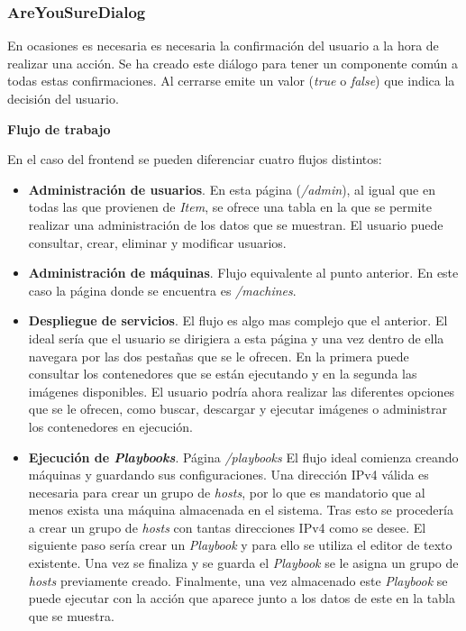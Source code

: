 \subsubsection{AreYouSureDialog}


En ocasiones es necesaria es necesaria la confirmación del usuario a la hora de realizar una acción. Se ha creado este  diálogo para tener un componente común a todas estas confirmaciones. Al cerrarse emite un valor (\textit{true} o \textit{false}) que indica la decisión del usuario.


\bigskip
\textbf{Flujo de trabajo}

En el caso del frontend se pueden diferenciar cuatro flujos distintos:

\begin{itemize}
	\item \textbf{Administración de usuarios}. En esta página (\textit{/admin}), al igual que en todas las que provienen de \textit{Item}, se ofrece una tabla en la que se permite realizar una administración de los datos que se muestran. El usuario puede consultar, crear, eliminar y modificar usuarios.
	\item \textbf{Administración de máquinas}. Flujo equivalente al punto anterior. En este caso la página donde se encuentra es \textit{/machines}.
	\item \textbf{Despliegue de servicios}. El flujo es algo mas complejo que el anterior. El ideal sería que el usuario se dirigiera a esta página y una vez dentro de ella navegara por las dos pestañas que se le ofrecen. En la primera puede consultar los contenedores que se están ejecutando y en la segunda las imágenes disponibles. El usuario podría ahora realizar las diferentes opciones que se le ofrecen, como buscar, descargar y ejecutar imágenes o administrar los contenedores en ejecución.
	\item \textbf{Ejecución de \textit{Playbooks}}. Página \textit{/playbooks} El flujo ideal comienza creando máquinas y guardando sus configuraciones. Una dirección IPv4 válida es necesaria para crear un grupo de \textit{hosts}, por lo que es mandatorio que al menos exista una máquina almacenada en el sistema. Tras esto se procedería a crear un grupo de \textit{hosts} con tantas direcciones IPv4 como se desee. El siguiente paso sería crear un \textit{Playbook} y para ello se utiliza el editor de texto existente. Una vez se finaliza y se guarda el \textit{Playbook} se le asigna un grupo de \textit{hosts} previamente creado. Finalmente, una vez almacenado este \textit{Playbook} se puede ejecutar con la acción que aparece junto a los datos de este en la tabla que se muestra.
\end{itemize}

